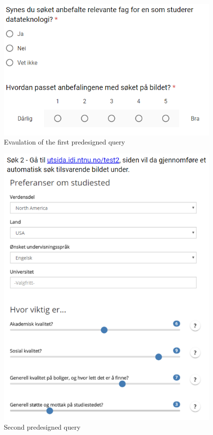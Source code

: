 \begin{figure}[h]
    \centering
    \includegraphics[width=1\textwidth]{fig/form2/s7_2.PNG}
    \caption[]{Evaulation of the first predesigned query}
    \label{fig:questionnaire_2_questions_p8}
\end{figure}
\begin{figure}[h]
    \centering
    \includegraphics[width=1\textwidth]{fig/form2/s7_3.PNG}
    \caption[]{Second predesigned query}
    \label{fig:questionnaire_2_questions_p9}
\end{figure}
